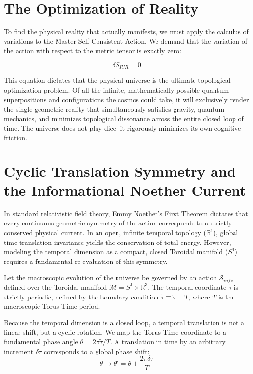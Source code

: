 \documentclass[12pt,openany]{book}
\theoremstyle{plain}
\theoremstyle{definition}
\theoremstyle{remark}
\begin{document}
\section{The Optimization of Reality}

To find the physical reality that actually manifests, we must apply the calculus of variations to the Master Self-Consistent Action. We demand that the variation of the action with respect to the metric tensor is exactly zero:

\begin{equation}
\delta S_{IUR} = 0
\end{equation}

This equation dictates that the physical universe is the ultimate topological optimization problem. Of all the infinite, mathematically possible quantum superpositions and configurations the cosmos could take, it will exclusively render the single geometric reality that simultaneously satisfies gravity, quantum mechanics, and minimizes topological dissonance across the entire closed loop of time. The universe does not play dice; it rigorously minimizes its own cognitive friction.

\section{Cyclic Translation Symmetry and the Informational Noether Current}

In standard relativistic field theory, Emmy Noether's First Theorem dictates that every continuous geometric symmetry of the action corresponds to a strictly conserved physical current. In an open, infinite temporal topology ($\mathbb{R}^1$), global time-translation invariance yields the conservation of total energy. However, modeling the temporal dimension as a compact, closed Toroidal manifold ($S^1$) requires a fundamental re-evaluation of this symmetry.

Let the macroscopic evolution of the universe be governed by an action $\mathcal{S}_{info}$ defined over the Toroidal manifold $\mathcal{M} = S^1 \times \mathbb{R}^3$. The temporal coordinate $\tilde{\tau}$ is strictly periodic, defined by the boundary condition $\tilde{\tau} \equiv \tilde{\tau} + T$, where $T$ is the macroscopic Torus-Time period.

Because the temporal dimension is a closed loop, a temporal translation is not a linear shift, but a cyclic rotation. We map the Torus-Time coordinate to a fundamental phase angle $\theta = 2\pi\tilde{\tau} / T$. A translation in time by an arbitrary increment $\delta\tau$ corresponds to a global phase shift:$$\theta \to \theta' = \theta + \frac{2\pi \delta\tau}{T}$$
\end{document}
